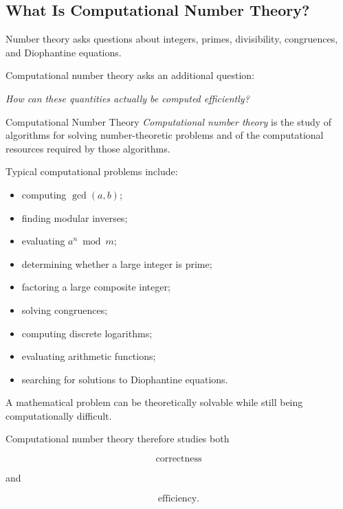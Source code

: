 \subsection{What Is Computational Number Theory?}
\label{subsec:what-is-computational-number-theory}

Number theory asks questions about integers, primes, divisibility,
congruences, and Diophantine equations.

Computational number theory asks an additional question:

\begin{center}
\emph{How can these quantities actually be computed efficiently?}
\end{center}

\begin{definitionbox}{Computational Number Theory}
\emph{Computational number theory} is the study of algorithms for solving
number-theoretic problems and of the computational resources required by
those algorithms.
\end{definitionbox}

Typical computational problems include:

\begin{itemize}
    \item computing \(\gcd(a,b)\);
    \item finding modular inverses;
    \item evaluating \(a^n\bmod m\);
    \item determining whether a large integer is prime;
    \item factoring a large composite integer;
    \item solving congruences;
    \item computing discrete logarithms;
    \item evaluating arithmetic functions;
    \item searching for solutions to Diophantine equations.
\end{itemize}

\begin{conceptbox}
A mathematical problem can be theoretically solvable while still being
computationally difficult.

Computational number theory therefore studies both

\[ \boxed{\text{correctness}} \]

and

\[ \boxed{\text{efficiency}}. \]
\end{conceptbox}

